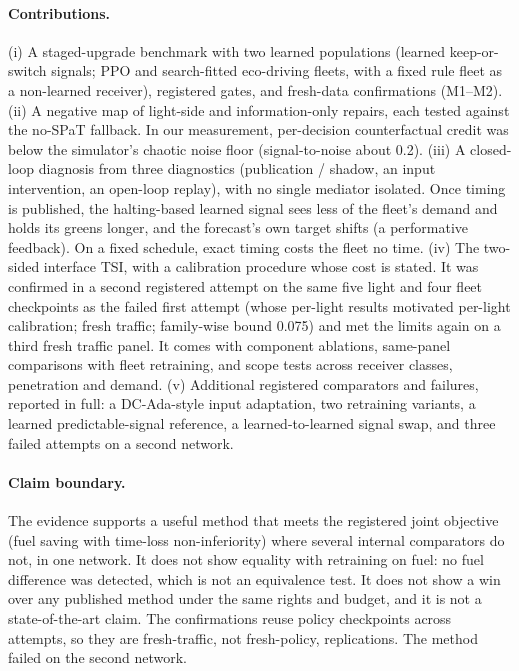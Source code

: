 \documentclass[11pt]{article}
\begin{document}
\paragraph{Contributions.}
(i) A staged-upgrade benchmark with two learned populations (learned keep-or-switch signals; PPO and search-fitted eco-driving fleets, with
a fixed rule fleet as a non-learned receiver), registered gates, and fresh-data confirmations (M1--M2).
(ii) A negative map of light-side and information-only repairs, each tested against the no-SPaT fallback. In our measurement,
per-decision counterfactual credit was below the simulator's chaotic noise floor (signal-to-noise about 0.2).
(iii) A closed-loop diagnosis from three diagnostics (publication / shadow, an input intervention, an open-loop replay), with no single
mediator isolated. Once timing is published, the halting-based learned signal sees less of the fleet's demand and holds its greens longer,
and the forecast's own target shifts (a performative feedback). On a fixed schedule, exact timing costs the fleet no time.
(iv) The two-sided interface TSI, with a calibration procedure whose cost is stated. It was confirmed in a second registered attempt on the
same five light and four fleet checkpoints as the failed first attempt (whose per-light results motivated per-light calibration; fresh
traffic; family-wise bound 0.075) and met the limits again on a third fresh traffic panel. It comes with component ablations, same-panel
comparisons with fleet retraining, and scope tests across receiver classes, penetration and demand.
(v) Additional registered comparators and failures, reported in full: a DC-Ada-style input adaptation, two retraining variants, a learned
predictable-signal reference, a learned-to-learned signal swap, and three failed attempts on a second network.

\paragraph{Claim boundary.} The evidence supports a useful method that meets the registered joint objective (fuel saving with time-loss
non-inferiority) where several internal comparators do not, in one network. It does not
show equality with retraining on fuel: no fuel difference was detected, which is not an equivalence test. It does not show a win over any
published method under the same rights and budget, and it is not a state-of-the-art claim. The confirmations reuse policy checkpoints
across attempts, so they are fresh-traffic, not fresh-policy, replications. The method failed on the second network.
\end{document}
